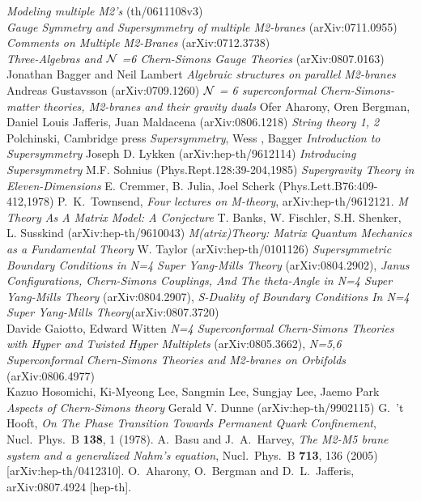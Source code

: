 \documentclass[12pt]{article}
\def\calN{{\cal N}}
\begin{document}
\newpage

\begin{thebibliography}{99}

{\it Modeling multiple M2's } (th/0611108v3) \\
{\it Gauge Symmetry and Supersymmetry of multiple M2-branes} (arXiv:0711.0955) \\
{\it Comments on Multiple M2-Branes} (arXiv:0712.3738) \\
{\it Three-Algebras and $\calN$ =6 Chern-Simons Gauge Theories} (arXiv:0807.0163) \\
Jonathan Bagger and Neil Lambert
{\it Algebraic structures on parallel M2-branes} Andreas Gustavsson  (arXiv:0709.1260)
{\it $\calN$ = 6 superconformal Chern-Simons-matter theories, M2-branes and their gravity duals 
}  Ofer Aharony, Oren Bergman, Daniel Louis Jafferis, Juan Maldacena (arXiv:0806.1218)
{\it String theory 1, 2} Polchinski, Cambridge press
{\it Supersymmetry},  Wess , Bagger
{\it Introduction to Supersymmetry} Joseph D. Lykken (arXiv:hep-th/9612114)
{\it Introducing Supersymmetry} M.F. Sohnius (Phys.Rept.128:39-204,1985)
{\it Supergravity Theory in Eleven-Dimensions} E. Cremmer, B. Julia, Joel Scherk (Phys.Lett.B76:409-412,1978)
  P.~K.~Townsend,
  {\it Four lectures on M-theory},
  arXiv:hep-th/9612121.
{\it M Theory As A Matrix Model: A Conjecture} T. Banks, W. Fischler, S.H. Shenker, L. Susskind (arXiv:hep-th/9610043)
{\it  M(atrix)Theory: Matrix Quantum Mechanics as a Fundamental Theory} W. Taylor (arXiv:hep-th/0101126)
{\it Supersymmetric Boundary Conditions in N=4 Super Yang-Mills Theory} (arXiv:0804.2902), 
{\it Janus Configurations, Chern-Simons Couplings, And The theta-Angle in N=4 Super Yang-Mills Theory} (arXiv:0804.2907), 
{\it S-Duality of Boundary Conditions In N=4 Super Yang-Mills Theory}(arXiv:0807.3720) \\
Davide Gaiotto, Edward Witten
{\it N=4 Superconformal Chern-Simons Theories with Hyper and Twisted Hyper Multiplets}
(arXiv:0805.3662), 
{\it N=5,6 Superconformal Chern-Simons Theories and M2-branes on Orbifolds}
(arXiv:0806.4977)\\
Kazuo Hosomichi, Ki-Myeong Lee, Sangmin Lee, Sungjay Lee, Jaemo Park 
{\it Aspects of Chern-Simons theory} Gerald V. Dunne (arXiv:hep-th/9902115)
  G.~'t Hooft,
{\it On The Phase Transition Towards Permanent Quark Confinement},
  Nucl.\ Phys.\  B {\bf 138}, 1 (1978).
  A.~Basu and J.~A.~Harvey,
  {\it The M2-M5 brane system and a generalized Nahm's equation},
  Nucl.\ Phys.\  B {\bf 713}, 136 (2005)
  [arXiv:hep-th/0412310].
  O.~Aharony, O.~Bergman and D.~L.~Jafferis,
  arXiv:0807.4924 [hep-th].


\end{thebibliography}
\end{document}
